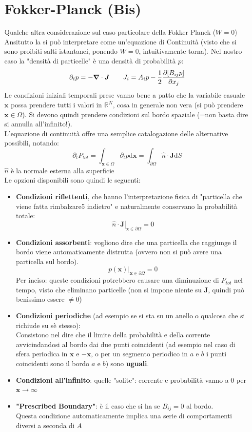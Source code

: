\documentclass[a4paper,12pt]{article}
\newcommand{\eva}[2]{\left.#1\right|_{#2}}
\theoremstyle{plain}
\renewcommand{\vec}[1]{{\boldsymbol{#1}}}
\theoremstyle{definition}
\newcommand{\f}[2]{\frac{#1}{#2}}
\newcommand{\tdv}{\partial_t}
\renewcommand{\d}{\text{d}}
\newcommand{\pos}{\vec{x}}
\newcommand{\ra}{\rightarrow}
\theoremstyle{remark}
\begin{document}
\section{Fokker-Planck (Bis)}
Qualche altra considerazione sul caso particolare della Fokker Planck ($W=0$)
\\ Ansitutto la si può interpretare come un'equazione di Continuità (visto che si sono proibiti salti istantanei, ponendo $W=0$, intuitivamente torna). Nel nostro caso la "densità di particelle" è una densità di probabilità $p$:
\[\tdv p =-\vec{\nabla}\cdot\vec{J}\quad\quad{J}_i={A}_i p-\f{1}{2}\pdv{[B_{ij}p]}{x_j}		\]
Le condizioni iniziali temporali prese vanno bene a patto che la  variabile casuale $\pos$ possa prendere tutti i valori in $\mathbb{R}^N$, cosa in generale non vera (si può prendere $\pos\in\Omega$). Si devono quindi prendere condizioni sul bordo spaziale (=non basta dire si annulla all'infinito!). \\L'equazione di continuità offre una semplice catalogazione delle alternative possibili, notando:\[\tdv P_{tot}= 		\int_{\pos\in\Omega} \tdv p\d \pos=\int_{\partial \Omega}	\hat{n}\cdot \vec{J}		 \d S	\]
$\hat{n}$ è la normale esterna alla superficie
\\
Le opzioni disponibili sono quindi le seguenti:
\begin{itemize}
	\item  \textbf{Condizioni riflettenti}, che hanno l'interpretazione fisica di "particella che viene fatta rimbalzare5 indietro" e naturalmente conservano la probabilità totale:
	\[\eva{\hat{n}\cdot \vec{J}}{\pos \in \partial\Omega}=0\]
	\item \textbf{Condizioni assorbenti}: vogliono dire che una particella che raggiunge il bordo viene automaticamente distrutta (ovvero non si può avere una particella sul bordo).
	\[\eva{ p(\pos)}{\pos \in \partial\Omega}=0\]
	Per inciso: queste condizioni potrebbero causare una diminuzione di $P_{tot}$ nel tempo, visto che eliminano particelle (non si impone niente su $\vec{J}$, quindi può benissimo essere $\ne 0$)

	\item \textbf{Condizioni periodiche} (ad esempio se si sta su un anello o qualcosa che si richiude su sè stesso):
	\\ Consistono nel dire che il limite della probabilità e della corrente  avvicindandosi al bordo dai due punti coincidenti (ad esempio nel caso di sfera periodica in $\pos $ e $-\pos$, o per un segmento periodico in $a $ e $b$ i punti coincidenti sono il bordo $a$ e $b$) sono \textbf{uguali}.
	
	\item \textbf{Condizioni all'infinito}: quelle "solite": corrente e probabilità vanno a $0$ per $\pos\ra \infty$
	\item  \textbf{"Prescribed Boundary"}: è il caso che si ha se $B_{ij}=0$ al bordo. \\Questa condizione automaticamente implica una serie di comportamenti diversi a seconda di $A$
\end{itemize}
\end{document}
